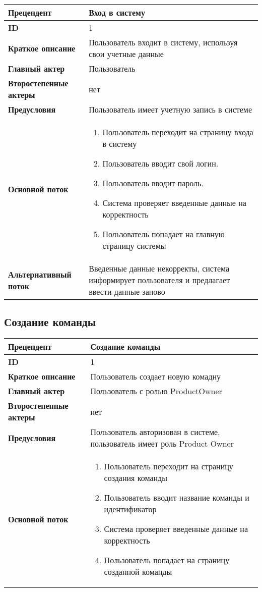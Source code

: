 \documentclass{article}
\begin{document}
\begin{tabular}{|l|p{9cm}|}
  \hline
  \textbf{Прецендент} & Вход в систему \\
  \hline
  \textbf{ID} & 1 \\
  \hline
  \textbf{Краткое описание} & Пользователь входит в систему, используя свои учетные данные \\
  \hline
  \textbf{Главный актер} & Пользователь\\
  \hline
  \textbf{Второстепенные актеры} & нет \\
  \hline
  \textbf{Предусловия} &  Пользователь имеет учетную запись в системе\\
  \hline
  \textbf{Основной поток} & \begin{enumerate}
    \item Пользователь переходит на страницу входа в систему
    \item Пользователь вводит свой логин.
    \item Пользователь вводит пароль.
    \item Система проверяет введенные данные на корректность
    \item Пользователь попадает на главную страницу системы
  \end{enumerate} \\
  \hline
  \textbf{Альтернативный поток} & Введенные данные некорректы, система информирует пользователя и предлагает ввести данные заново\\
  \hline
  \hline
\end{tabular}

\subsection{Создание команды}

\begin{tabular}{|l|p{9cm}|}
  \hline
  \textbf{Прецендент} & Создание команды  \\
  \hline
  \textbf{ID} & 1 \\
  \hline
  \textbf{Краткое описание} & Пользователь создает новую комадну\\
  \hline
  \textbf{Главный актер} & Пользователь с ролью ProductOwner \\
  \hline
  \textbf{Второстепенные актеры} & нет \\
  \hline
  \textbf{Предусловия} &  Пользователь авторизован в системе, пользователь имеет роль Product Owner \\
  \hline
  \textbf{Основной поток} & \begin{enumerate}
    \item Пользователь переходит на страницу создания команды
    \item Пользователь вводит название команды и идентификатор
    \item Система проверяет введенные данные на корректность
    \item Пользователь попадает на страницу созданной команды
  \end{enumerate} \\
  \hline
\end{tabular}
\end{document}
